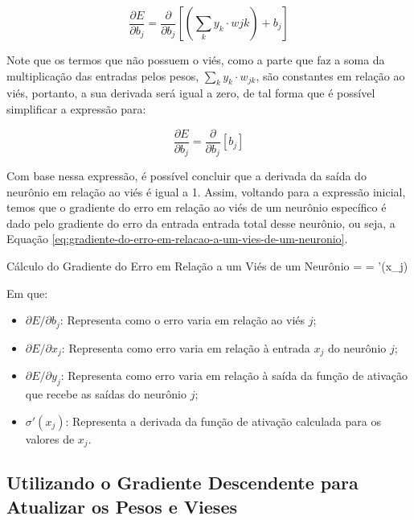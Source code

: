 \[
    \frac{\partial E}{\partial b_j} = \frac{\partial}{\partial b_j} \left[ \left( \sum_k y_k \cdot w{jk} \right) + b_j \right]
\]

Note que os termos que não possuem o viés, como a parte que faz a soma da multiplicação das entradas pelos pesos, $\sum_k y_k \cdot w_{jk}$, são constantes em relação ao viés, portanto, a sua derivada será igual a zero, de tal forma que é possível simplificar a expressão para:

\[
        \frac{\partial E}{\partial b_j} = \frac{\partial}{\partial b_j} \left[ b_j \right]
\]

Com base nessa expressão, é possível concluir que a derivada da saída do neurônio em relação ao viés é igual a 1. Assim, voltando para a expressão inicial, temos que o gradiente do erro em relação ao viés de um neurônio específico é dado pelo gradiente do erro da entrada entrada total desse neurônio, ou seja, a Equação \ref{eq:gradiente-do-erro-em-relacao-a-um-vies-de-um-neuronio}.

\begin{equacaodestaque}{Cálculo do Gradiente do Erro em Relação a um Viés de um Neurônio}
     =  \quad {} \quad {} =  \cdot \sigma'(x_j)
    \label{eq:gradiente-do-erro-em-relacao-a-um-vies-de-um-neuronio}
\end{equacaodestaque}

Em que:

\begin{itemize}
    \item $\partial E / \partial b_j$: Representa como o erro varia em relação ao viés $j$;
    \item $\partial E / \partial x_j$: Representa como erro varia em relação à entrada $x_j$ do neurônio $j$;
    \item $\partial E / \partial y_j$: Representa como erro varia em relação à saída da função de ativação que recebe as saídas do neurônio $j$;
    \item $\sigma'(x_j)$: Representa a derivada da função de ativação calculada para os valores de $x_j$.
\end{itemize}

\subsection{Utilizando o Gradiente Descendente para Atualizar os Pesos e Vieses}

